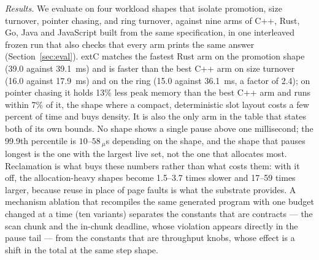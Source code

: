 \noindent\emph{Results.}
We evaluate on four workload shapes that isolate promotion, size turnover, pointer chasing, and ring turnover, against nine
arms of C++, Rust, Go, Java and JavaScript built from the same specification, in one interleaved frozen run that also checks
that every arm prints the same answer (Section~\ref{sec:eval}).
extC matches the fastest Rust arm on the promotion shape (39.0 against 39.1~ms) and is faster than the best C++ arm on size
turnover (16.0 against 17.9~ms) and on the ring (15.0 against 36.1~ms, a factor of 2.4); on pointer chasing it holds
13\% less peak memory than the best C++ arm and runs within 7\% of it, the shape where a compact, deterministic slot layout
costs a few percent of time and buys density. It is also the only arm in the table that states both of its own bounds.
No shape shows a single pause above one millisecond; the 99.9th percentile is $10$--$58\,_\mu$s depending on the shape, and the
shape that pauses longest is the one with the largest live set, not the one that allocates most.
Reclamation is what buys these numbers rather than what costs them: with it off, the allocation-heavy shapes become 1.5--3.7
times slower and 17--59 times larger, because reuse in place of page faults is what the substrate provides.
A mechanism ablation that recompiles the same generated program with one budget changed at a time (ten variants) separates
the constants that are contracts --- the scan chunk and the in-chunk deadline, whose violation appears directly in the pause
tail --- from the constants that are throughput knobs, whose effect is a shift in the total at the same step shape.

